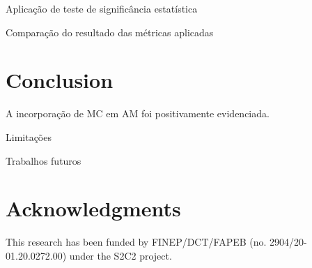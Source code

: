 \documentclass[
]{ceurart}
\begin{document}
Aplicação de teste de significância estatística 

Comparação do resultado das métricas aplicadas


\section{Conclusion}

A incorporação de MC em AM foi positivamente evidenciada.

Limitações

\par Trabalhos futuros


\section{Acknowledgments}

This research has been funded by FINEP/DCT/FAPEB (no. 2904/20-01.20.0272.00) under the S2C2 project.



\end{document}
